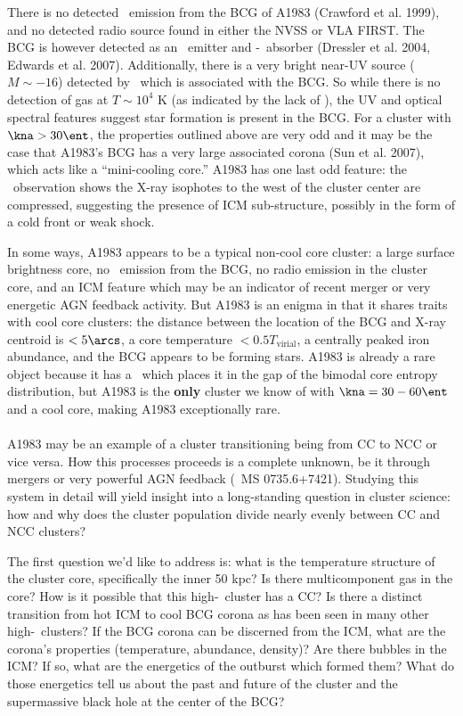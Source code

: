 \documentclass[letterpaper,11pt,twocolumn]{article}
\begin{document}
There is no detected \halpha\ emission from the BCG of A1983 (Crawford
et al. 1999), and no detected radio source found in either the NVSS or
VLA FIRST. The BCG is however detected as an \oii\ emitter and
\hdelta-\hbeta\ absorber (Dressler et al. 2004, Edwards et
al. 2007). Additionally, there is a very bright near-UV source ($M
\sim -16$) detected by \galex\ which is associated with the BCG. So
while there is no detection of gas at $T \sim 10^4$ K (as indicated by
the lack of \halpha), the UV and optical spectral features suggest
star formation is present in the BCG. For a cluster with $\kna > 30
\ent$, the properties outlined above are very odd and it may be the
case that A1983's BCG has a very large associated corona (Sun et
al. 2007), which acts like a ``mini-cooling core.'' A1983 has one last
odd feature: the \xmm\ observation shows the X-ray isophotes to the
west of the cluster center are compressed, suggesting the presence of
ICM sub-structure, possibly in the form of a cold front or weak shock.

In some ways, A1983 appears to be a typical non-cool core cluster: a
large surface brightness core, no \halpha\ emission from the BCG, no
radio emission in the cluster core, and an ICM feature which may be an
indicator of recent merger or very energetic AGN feedback
activity. But A1983 is an enigma in that it shares traits with cool
core clusters: the distance between the location of the BCG and X-ray
centroid is $< 5\arcs$, a core temperature $< 0.5
T_{\mathrm{virial}}$, a centrally peaked iron abundance, and the BCG
appears to be forming stars. A1983 is already a rare object because it
has a \kna\ which places it in the gap of the bimodal core entropy
distribution, but A1983 is the {\bf{only}} cluster we know of with
$\kna = 30-60 \ent$ and a cool core, making A1983 exceptionally
rare.\\

\\
A1983 may be an example of a cluster transitioning being from CC to
NCC or vice versa. How this processes proceeds is a complete unknown,
be it through mergers or very powerful AGN feedback (\eg\ MS
0735.6+7421). Studying this system in detail will yield insight into a
long-standing question in cluster science: how and why does the
cluster population divide nearly evenly between CC and NCC clusters?

The first question we'd like to address is: what is the temperature
structure of the cluster core, specifically the inner 50 kpc? Is there
multicomponent gas in the core? How is it possible that this
high-\kna\ cluster has a CC? Is there a distinct transition from hot
ICM to cool BCG corona as has been seen in many other
high-\kna\ clusters? If the BCG corona can be discerned from the ICM,
what are the corona's properties (temperature, abundance, density)?
Are there bubbles in the ICM? If so, what are the energetics of the
outburst which formed them? What do those energetics tell us about the
past and future of the cluster and the supermassive black hole at the
center of the BCG? 
\end{document}
